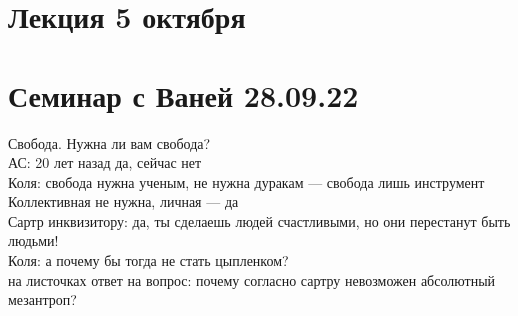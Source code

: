 \documentclass[a4paper,12pt]{article}
\begin{document}
\section{Лекция 5 октября}

\section{Семинар с Ваней 28.09.22}
Свобода. Нужна ли вам свобода?\\
АС: 20 лет назад да, сейчас нет \\
Коля: свобода нужна ученым, не нужна дуракам --- свобода лишь инструмент\\
Коллективная не нужна, личная --- да\\
Сартр инквизитору: да, ты сделаешь людей счастливыми, но они перестанут быть людьми!\\
Коля: а почему бы тогда не стать цыпленком?\\
на листочках ответ на вопрос: почему согласно сартру невозможен абсолютный мезантроп? 
\end{document}
